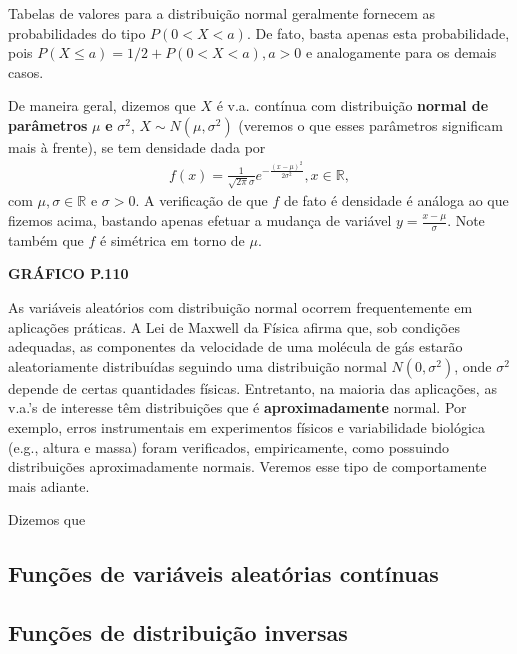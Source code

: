 \documentclass[../Notas.tex]{subfiles}
\begin{document}
\begin{example}
\begin{remark}
Tabelas de valores para a distribuição normal geralmente fornecem as probabilidades do tipo $P(0 < X < a)$. De fato, basta apenas esta probabilidade, pois $P(X\leq a) = 1/2 + P(0 < X < a), a>0$ e analogamente para os demais casos.
\end{remark}
De maneira geral, dizemos que $X$ é v.a. contínua com distribuição \textbf{normal de parâmetros} $\mu$ \textbf{e} $\sigma^2$, $X\sim N(\mu, \sigma^2)$ (veremos o que esses parâmetros significam mais à frente), se tem densidade dada por
\begin{align*}
    f(x) = \frac{1}{\sqrt{2\pi}\sigma}e^{-\frac{(x-\mu)^2}{2\sigma^2}}, x\in\mathbb{R},
\end{align*}
com $\mu,\sigma\in\mathbb{R}$ e $\sigma>0$. A verificação de que $f$ de fato é densidade é análoga ao que fizemos acima, bastando apenas efetuar a mudança de variável $y = \displaystyle{\frac{x-\mu}{\sigma}}$. Note também que $f$ é simétrica em torno de $\mu$.
\begin{center}
    \textbf{GRÁFICO P.110}
\end{center}
As variáveis aleatórios com distribuição normal ocorrem frequentemente em aplicações práticas. A Lei de Maxwell da Física afirma que, sob condições adequadas, as componentes da velocidade de uma molécula de gás estarão aleatoriamente distribuídas seguindo uma distribuição normal $N(0,\sigma^2)$, onde $\sigma^2$ depende de certas quantidades físicas. Entretanto, na maioria das aplicações, as v.a.'s de interesse têm distribuições que é \textbf{aproximadamente} normal. Por exemplo, erros instrumentais em experimentos físicos e variabilidade biológica (e.g., altura e massa) foram verificados, empiricamente, como possuindo distribuições aproximadamente normais. Veremos esse tipo de comportamente mais adiante.
\end{example}

\begin{example}
Dizemos que
\end{example}



\subsection{Funções de variáveis aleatórias contínuas}

\subsection{Funções de distribuição inversas}
\end{document}

